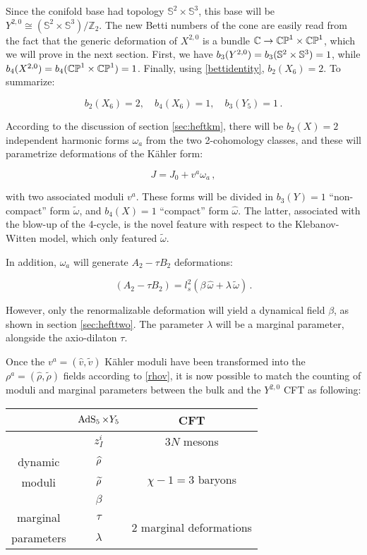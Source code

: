 Since the conifold base had topology $\mathbb{S}^2 \times \mathbb{S}^3$\cite{Candelas}, this base will be $Y^{2,0} \cong (\mathbb{S}^2 \times \mathbb{S}^3)/\mathbb{Z}_2$. The new Betti numbers of the cone are easily read from the fact that the generic deformation of $X^{2,0}$ is a bundle $\mathbb{C} \rightarrow \mathbb{CP}^1 \times \mathbb{CP}^1$, which we will prove in the next section. First, we have $b_3(Y^{2,0}) = b_3(\mathbb{S}^2 \times \mathbb{S}^3) = 1$, while $b_4(X^{2,0}) = b_4(\mathbb{CP}^1 \times \mathbb{CP}^1) = 1$. Finally, using \eqref{bettidentity}, $b_2(X_6) = 2$. To summarize:

\begin{equation}
	b_2(X_6) = 2,\quad b_4(X_6) = 1,\quad b_3(Y_5) = 1\,.
	\label{}
\end{equation}


According to the discussion of section \ref{sec:heftkm}, there will be $b_2(X) = 2$ independent harmonic forms $\omega_a$ from the two 2-cohomology classes, and these will parametrize deformations of the K\"ahler form:

\begin{equation}
	J = J_0 + v^a \omega_a\,,
	\label{}
\end{equation}

with two associated moduli $v^a$. These forms will be divided in $b_3(Y) = 1$ ``non-compact'' form $\tilde\omega$, and $b_4(X) = 1$ ``compact'' form $\hat \omega$. The latter, associated with the blow-up of the 4-cycle, is the novel feature with respect to the Klebanov-Witten model, which only featured $\tilde\omega$.

In addition, $\omega_a$ will generate $A_2 - \tau B_2$ deformations:

\begin{equation}
	(A_2 - \tau B_2) = l_s^2 \left( \beta \, \hat \omega + \lambda \, \tilde \omega \right) \,.
	\label{}
\end{equation}

However, only the renormalizable deformation will yield a dynamical field $\beta$, as shown in section \ref{sec:hefttwo}. The parameter $\lambda$ will be a marginal parameter, alongside the axio-dilaton $\tau$.

Once the $v^a = (\hat v, \tilde v)$ K\"ahler moduli have been transformed into the $\rho^a = (\hat \rho, \tilde \rho)$ fields according to \eqref{rhov}, it is now possible to match the counting of moduli and marginal parameters between the bulk and the $Y^{2,0}$ CFT as following:

\begin{center}
\begin{tabular}{ccc}
	 		& $\operatorname{AdS}_{5} \times Y_5$ & CFT \\ \midrule \midrule
			& $ z_I^i$ & $3N$ mesons\\ \cmidrule{2-3} 
dynamic 		& $\widehat{\rho}$ & \multirow{3}{*}{$\chi-1 = 3$ baryons} \\
moduli			& $\widetilde{\rho}$ & \\
			& $ \beta$ & \\ \midrule
marginal	& $\tau$ 	&  \multirow{2}{*}{$2$ marginal deformations}	\\
parameters			& $\lambda$ &	
\end{tabular}
\end{center}

